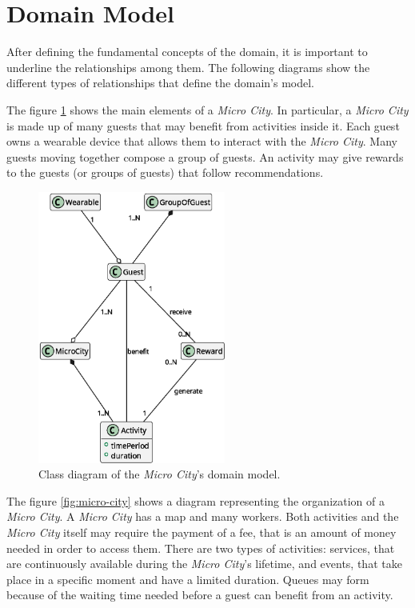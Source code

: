 \section{Domain Model}
\label{sec:model}

After defining the fundamental concepts of the domain, it is important to underline the relationships among them.
The following diagrams show the different types of relationships that define the domain's model.

The figure \ref{fig:domain-overview} shows the main elements of a \textit{Micro City}.
In particular, a \textit{Micro City} is made up of many guests that may benefit from activities inside it.
Each guest owns a wearable device that allows them to interact with the \textit{Micro City}.
Many guests moving together compose a group of guests.
An activity may give rewards to the guests (or groups of guests) that follow recommendations.

\begin{figure}[H]
    \centering
    \includegraphics[width=0.55\textwidth]{./img/domain_overview-0}
    \caption{Class diagram of the \textit{Micro City}'s domain model.}
    \label{fig:domain-overview}
\end{figure}

\newpage

The figure \ref{fig:micro-city} shows a diagram representing the organization of a \textit{Micro City}.
A \textit{Micro City} has a map and many workers.
Both activities and the \textit{Micro City} itself may require the payment of a fee, that is an amount of money needed in order to access them.
There are two types of activities: services, that are continuously available during the \textit{Micro City}'s lifetime, and events, that take place in a specific moment and have a limited duration.
Queues may form because of the waiting time needed before a guest can benefit from an activity.

